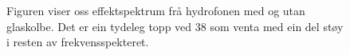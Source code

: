 \begin{figure}[htbp]
	\centering
	\caption[Effektspektrum av hydrofon i måletank]{Figuren viser oss effektspektrum frå hydrofonen med og utan glaskolbe. Det er ein tydeleg topp ved \unit	{38}{\kilo\hertz} som venta med ein del støy i resten av frekvensspekteret.}
	\label{fig:effekt}
\end{figure}